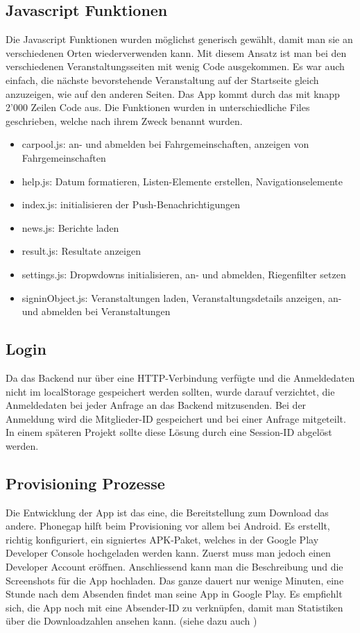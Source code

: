 \newpage
\FloatBarrier
\subsection{Javascript Funktionen}
Die Javascript Funktionen wurden möglichst generisch gewählt, damit man sie an verschiedenen Orten wiederverwenden kann. Mit diesem Ansatz ist man bei den verschiedenen Veranstaltungsseiten mit wenig Code ausgekommen. Es war auch einfach, die nächste bevorstehende Veranstaltung auf der Startseite gleich anzuzeigen, wie auf den anderen Seiten. Das App kommt durch das mit knapp 2'000 Zeilen Code aus. Die Funktionen wurden in unterschiedliche Files geschrieben, welche nach ihrem Zweck benannt wurden.
\begin{itemize}
\item carpool.js: an- und abmelden bei Fahrgemeinschaften, anzeigen von Fahrgemeinschaften
\item help.js:  Datum formatieren,  Listen-Elemente erstellen, Navigationselemente
\item index.js: initialisieren der Push-Benachrichtigungen
\item news.js: Berichte laden
\item result.js: Resultate anzeigen
\item settings.js: Dropwdowns initialisieren, an- und abmelden, Riegenfilter setzen
\item signinObject.js: Veranstaltungen laden, Veranstaltungsdetails anzeigen, an- und abmelden bei Veranstaltungen 
\end{itemize}

\subsection{Login}
Da das Backend nur über eine HTTP-Verbindung verfügte und die Anmeldedaten nicht im localStorage  gespeichert werden sollten, wurde darauf verzichtet, die Anmeldedaten bei jeder Anfrage an das Backend mitzusenden. Bei der Anmeldung wird die Mitglieder-ID gespeichert und bei einer Anfrage mitgeteilt. In einem späteren Projekt sollte diese Lösung durch eine Session-ID abgelöst werden.

\subsection{Provisioning Prozesse}
Die Entwicklung der App ist das eine, die Bereitstellung zum Download das andere. Phonegap hilft beim Provisioning vor allem bei Android. Es erstellt, richtig konfiguriert, ein signiertes APK-Paket, welches in der Google Play Developer Console hochgeladen werden kann. Zuerst muss man jedoch einen Developer Account eröffnen. Anschliessend kann man die Beschreibung und die Screenshots für die App hochladen. Das ganze dauert nur wenige Minuten, eine Stunde nach dem Absenden findet man seine App in Google Play. Es empfiehlt sich, die App noch mit eine Absender-ID zu verknüpfen, damit man Statistiken über die Downloadzahlen ansehen kann. (siehe dazu auch \cite{android_prov})

